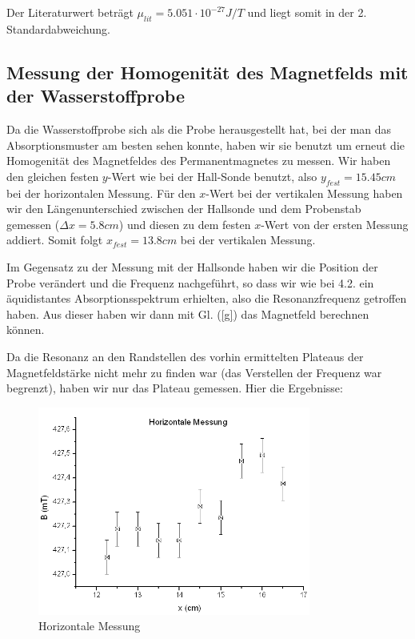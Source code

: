Der Literaturwert beträgt $\mu_{lit} = 5.051 \cdot 10^{-27} J/T$ und liegt somit in der 2. Standardabweichung.

\subsection{Messung der Homogenität des Magnetfelds mit der Wasserstoffprobe}

Da die Wasserstoffprobe sich als die Probe herausgestellt hat, bei der man das Absorptionsmuster am besten sehen konnte, haben wir sie benutzt um erneut die Homogenität des Magnetfeldes des Permanentmagnetes zu messen. Wir haben den gleichen festen $y$-Wert wie bei der Hall-Sonde benutzt, also $y_{fest} = 15.45 cm$ bei der horizontalen Messung. Für den $x$-Wert bei der vertikalen Messung haben wir den Längenunterschied zwischen der Hallsonde und dem Probenstab gemessen ($\Delta x = 5.8 cm$) und diesen zu dem festen $x$-Wert von der ersten Messung addiert. Somit folgt $x_{fest} = 13.8 cm$ bei der vertikalen Messung.

Im Gegensatz zu der Messung mit der Hallsonde haben wir die Position der Probe verändert und die Frequenz nachgeführt, so dass wir wie bei 4.2. ein äquidistantes Absorptionsspektrum erhielten, also die Resonanzfrequenz getroffen haben. Aus dieser haben wir dann mit Gl. (\ref{g}) das Magnetfeld berechnen können. 

Da die Resonanz an den Randstellen des vorhin ermittelten Plateaus der Magnetfeldstärke nicht mehr zu finden war (das Verstellen der Frequenz war begrenzt), haben wir nur das Plateau gemessen. Hier die Ergebnisse:

\begin{figure}[H]
\centering \includegraphics[width=0.8\textwidth]{Bilder/homhor.png}
\caption{Horizontale Messung}
\end{figure}

